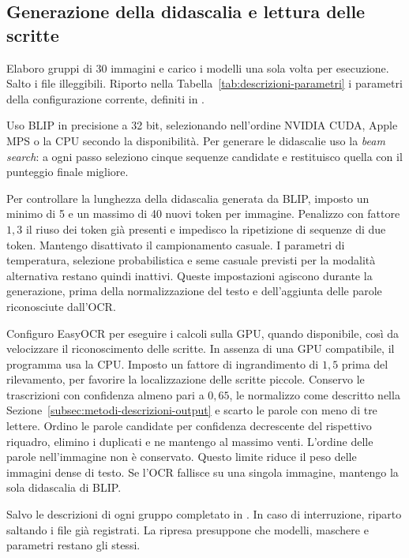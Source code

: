 \subsection{Generazione della didascalia e lettura delle scritte}
\label{subsec:metodi-descrizioni-modelli}

Elaboro gruppi di 30 immagini e carico i modelli una sola volta per esecuzione. Salto i file illeggibili. Riporto nella Tabella~\ref{tab:descrizioni-parametri} i parametri della configurazione corrente, definiti in .

Uso BLIP in precisione a 32 bit, selezionando nell'ordine NVIDIA CUDA, Apple MPS o la CPU secondo la disponibilità. Per generare le didascalie uso la \emph{beam search}: a ogni passo seleziono cinque sequenze candidate e restituisco quella con il punteggio finale migliore.

Per controllare la lunghezza della didascalia generata da BLIP, imposto un minimo di 5 e un massimo di 40 nuovi token per immagine. Penalizzo con fattore $1{,}3$ il riuso dei token già presenti e impedisco la ripetizione di sequenze di due token. Mantengo disattivato il campionamento casuale. I parametri di temperatura, selezione probabilistica e seme casuale previsti per la modalità alternativa restano quindi inattivi. Queste impostazioni agiscono durante la generazione, prima della normalizzazione del testo e dell'aggiunta delle parole riconosciute dall'OCR.

Configuro EasyOCR per eseguire i calcoli sulla GPU, quando disponibile, così da velocizzare il riconoscimento delle scritte. In assenza di una GPU compatibile, il programma usa la CPU. Imposto un fattore di ingrandimento di $1{,}5$ prima del rilevamento, per favorire la localizzazione delle scritte piccole. Conservo le trascrizioni con confidenza almeno pari a $0{,}65$, le normalizzo come descritto nella Sezione~\ref{subsec:metodi-descrizioni-output} e scarto le parole con meno di tre lettere. Ordino le parole candidate per confidenza decrescente del rispettivo riquadro, elimino i duplicati e ne mantengo al massimo venti. L'ordine delle parole nell'immagine non è conservato. Questo limite riduce il peso delle immagini dense di testo. Se l'OCR fallisce su una singola immagine, mantengo la sola didascalia di BLIP.

Salvo le descrizioni di ogni gruppo completato in . In caso di interruzione, riparto saltando i file già registrati. La ripresa presuppone che modelli, maschere e parametri restano gli stessi.

